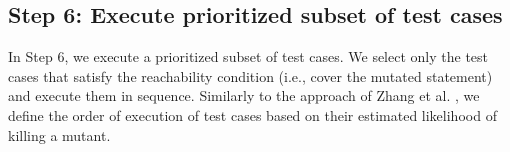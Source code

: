%
%
%

\subsection{Step 6: Execute prioritized subset of test cases}
\label{sec:step:prioritize}

In Step 6, we execute a prioritized subset of test cases.
We select only the test cases that satisfy
the reachability condition (i.e., cover the mutated statement) and  execute them in sequence.
Similarly to the approach of Zhang et al. \cite{zhang2013faster}, we define the order of execution of test cases based on their estimated likelihood of killing a mutant.
 

